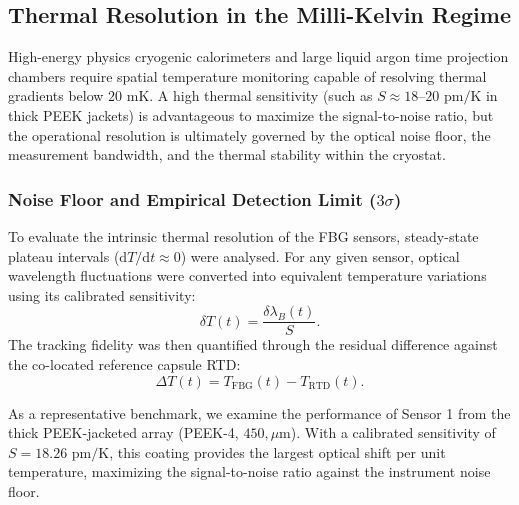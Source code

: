\documentclass[preprint,11pt]{elsarticle}
\begin{document}
\subsection{Thermal Resolution in the Milli-Kelvin Regime}
\label{subsec:millikelvin_resolution}

High-energy physics cryogenic calorimeters and large liquid argon time projection chambers require spatial temperature monitoring capable of resolving thermal gradients below $20\text{ mK}$. A high thermal sensitivity (such as $S \approx 18\text{--}20\text{ pm/K}$ in thick PEEK jackets) is advantageous to maximize the signal-to-noise ratio, but the operational resolution is ultimately governed by the optical noise floor, the measurement bandwidth, and the thermal stability within the cryostat.

\subsubsection{Noise Floor and Empirical Detection Limit ($3\sigma$)}

To evaluate the intrinsic thermal resolution of the FBG sensors, steady-state plateau intervals ($\mathrm{d}T/\mathrm{d}t \approx 0$) were analysed. For any given sensor, optical wavelength fluctuations were converted into equivalent temperature variations using its calibrated sensitivity:
\begin{equation}
    \delta T(t) = \frac{\delta \lambda_B(t)}{S}.
    \label{eq:delta_T_conversion}
\end{equation}
The tracking fidelity was then quantified through the residual difference against the co-located reference capsule RTD:
\begin{equation}
    \Delta T(t) = T_{\mathrm{FBG}}(t) - T_{\mathrm{RTD}}(t).
    \label{eq:residual_def}
\end{equation}

As a representative benchmark, we examine the performance of Sensor 1 from the thick PEEK-jacketed array (PEEK-4, $450,\mu\mathrm{m}$). With a calibrated sensitivity of $S = 18.26\text{ pm/K}$, this coating provides the largest optical shift per unit temperature, maximizing the signal-to-noise ratio against the instrument noise floor.
\end{document}
